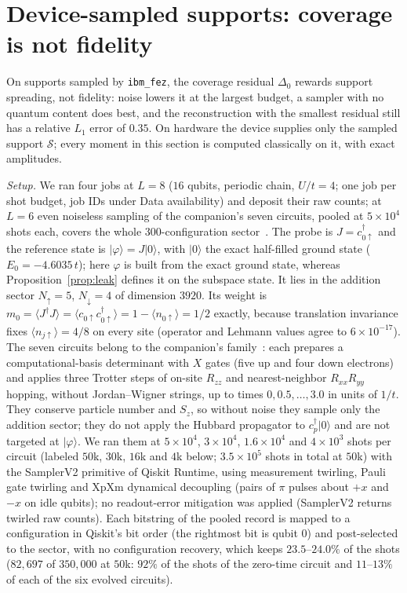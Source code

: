 \documentclass[submission, PhysCore]{SciPost}
\begin{document}
\section{Device-sampled supports: coverage is not fidelity}
\label{sec:device}
\suppressfloats[t]%
On supports sampled by \texttt{ibm\_fez}, the coverage residual $\Delta_0$ rewards support spreading, not fidelity: noise lowers it at the largest budget, a sampler with no quantum content does best, and the reconstruction with the smallest residual still has a relative $L_1$ error of $0.35$. On hardware the device supplies only the sampled support $\mathcal S$; every moment in this section is computed classically on it, with exact amplitudes.

\emph{Setup.} We ran four jobs at $L=8$ ($16$ qubits, periodic chain, $U/t=4$; one job per shot budget, job IDs under Data availability) and deposit their raw counts; at $L=6$ even noiseless sampling of the companion's seven circuits, pooled at $5\times10^{4}$ shots each, covers the whole $300$-configuration sector~\cite{SQDspec2608}. The probe is $J=c^{\dagger}_{0\uparrow}$ and the reference state is $|\varphi\rangle=J|0\rangle$, with $|0\rangle$ the exact half-filled ground state ($E_0=-4.6035\,t$); here $\varphi$ is built from the exact ground state, whereas Proposition~\ref{prop:leak} defines it on the subspace state. It lies in the addition sector $N_\uparrow=5$, $N_\downarrow=4$ of dimension $3920$. Its weight is $m_0=\langle J^\dagger J\rangle=\langle c_{0\uparrow}c^{\dagger}_{0\uparrow}\rangle=1-\langle n_{0\uparrow}\rangle=1/2$ exactly, because translation invariance fixes $\langle n_{j\uparrow}\rangle=4/8$ on every site (operator and Lehmann values agree to $6\times10^{-17}$). The seven circuits belong to the companion's family~\cite{SQDspec2608}: each prepares a computational-basis determinant with $X$ gates (five up and four down electrons) and applies three Trotter steps of on-site $R_{zz}$ and nearest-neighbor $R_{xx}R_{yy}$ hopping, without Jordan--Wigner strings, up to times $0,0.5,\dots,3.0$ in units of $1/t$. They conserve particle number and $S_z$, so without noise they sample only the addition sector; they do not apply the Hubbard propagator to $c^{\dagger}_p|0\rangle$ and are not targeted at $|\varphi\rangle$. We ran them at $5\times10^{4}$, $3\times10^{4}$, $1.6\times10^{4}$ and $4\times10^{3}$ shots per circuit (labeled $50$k, $30$k, $16$k and $4$k below; $3.5\times10^{5}$ shots in total at $50$k) with the SamplerV2 primitive of Qiskit Runtime, using measurement twirling, Pauli gate twirling and XpXm dynamical decoupling (pairs of $\pi$ pulses about $+x$ and $-x$ on idle qubits); no readout-error mitigation was applied (SamplerV2 returns twirled raw counts). Each bitstring of the pooled record is mapped to a configuration in Qiskit's bit order (the rightmost bit is qubit $0$) and post-selected to the sector, with no configuration recovery, which keeps $23.5$--$24.0\%$ of the shots ($82{,}697$ of $350{,}000$ at $50$k: $92\%$ of the shots of the zero-time circuit and $11$--$13\%$ of each of the six evolved circuits).
\end{document}
